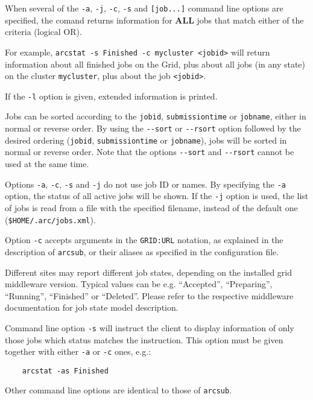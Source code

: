 \begin{framed}
  When several of the \verb#-a#,  \verb#-j#, \verb#-c#, \verb#-s# and \verb#[job...]#
  command line options are specified, the comand returns information for \textbf{ALL} jobs that
  match either of the criteria (logical OR).

  For example, \verb#arcstat -s Finished -c mycluster <jobid># will return information about all finished
  jobs on the Grid, plus about all jobs (in any state) on the cluster \verb#mycluster#, plus about the job \verb#<jobid>#.
\end{framed}

If the \verb#-l# option is given, extended information is printed.

Jobs can be sorted according to the \texttt{jobid},
\texttt{submissiontime} or \texttt{jobname}, either in normal or
reverse order. By using the \verb#--sort# or \verb#--rsort# option
followed by the desired ordering (\texttt{jobid},
\texttt{submissiontime} or \texttt{jobname}), jobs will be sorted in
normal or reverse order. Note that the options \verb#--sort# and
\verb#--rsort# cannot be used at the same time.

Options \verb#-a#, \verb#-c#, \verb#-s# and \verb#-j# do not use job ID or names. By
specifying the \verb#-a# option, the status of all active jobs will be shown. If the \verb#-j# option
is used, the list of jobs is read from a file with the specified filename, instead of
the default one (\texttt{{\$}HOME/.arc/jobs.xml}).

Option \verb#-c# accepts arguments in the \texttt{GRID:URL} notation,
as explained in the description of \texttt{arcsub}, or their aliases as
specified in the configuration file.

Different sites may report different job states, depending on
the installed grid middleware version. Typical values can be e.g.
``Accepted'', ``Preparing'', ``Running'', ``Finished'' or ``Deleted''.
Please refer to the respective middleware documentation for job state model
description.

Command line option \verb#-s# will instruct the client to display information
of only those jobs which status matches the instruction. This option must be given
together with either \verb#-a# or \verb#-c# ones, e.g.:
\begin{verbatim}
    arcstat -as Finished
\end{verbatim}

Other command line options are identical to those of \verb#arcsub#.

